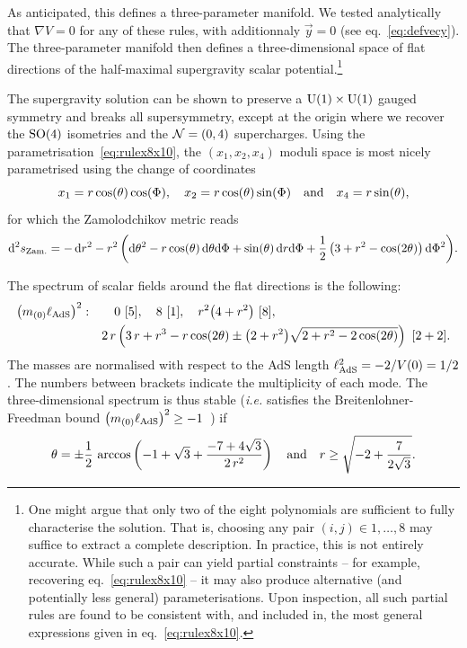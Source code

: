 \documentclass[11pt,a4paper]{article}
\renewcommand{\d}{\ensuremath{\mathrm{d}}\xspace}
\begin{document}
	As anticipated, this defines a three-parameter manifold. We tested analytically that $\nabla V = 0$ for any of these rules, with additionnaly $\vec{y}=0$ (see eq.~\eqref{eq:defvecy}). The three-parameter manifold then defines a three-dimensional space of flat directions of the half-maximal supergravity scalar potential.\footnote{One might argue that only two of the eight polynomials are sufficient to fully characterise the solution. That is, choosing any pair $(i,j) \in {1, \dots, 8}$ may suffice to extract a complete description. In practice, this is not entirely accurate. While such a pair can yield partial constraints -- for example, recovering eq.~\eqref{eq:rulex8x10} -- it may also produce alternative (and potentially less general) parameterisations. Upon inspection, all such partial rules are found to be consistent with, and included in, the most general expressions given in eq.~\eqref{eq:rulex8x10}.}

	The supergravity solution can be shown to preserve a ${\rm U}(1)\times{\rm U}(1)$ gauged symmetry and breaks all supersymmetry, except at the origin where we recover the ${\rm SO}(4)$ isometries and the ${\cal N}=(0,4)$ supercharges. Using the parametrisation~\eqref{eq:rulex8x10}, the $(x_{1},x_{2},x_{4})$ moduli space is most nicely parametrised using the change of coordinates
	\begin{equation}
		x_{1} = r\cos(\theta)\cos(\Phi), \quad x_{2} = r\cos(\theta)\sin(\Phi) \quad {\rm and} \quad x_{4} = r\sin(\theta),
	\end{equation}
	for which the Zamolodchikov metric reads
	\begin{equation}
		\d^{2}s_{\rm Zam.} = -\,\d r^{2} - r^{2}\,\bigg(\d \theta^{2} - r\cos(\theta)\,\d \theta\d\Phi + \sin(\theta)\,\d r\d\Phi + \frac{1}{2}\,\big(3+r^{2}-\cos(2\theta)\big)\,\d\Phi^{2} \bigg).
	\end{equation}

	The spectrum of scalar fields around the flat directions is the following:
	\begin{equation}
		\begin{aligned}
			\big(m_{(0)}\ell_{\rm AdS}\big)^{2}: & \qquad 0 \ [5], \quad 8 \ [1], \quad r^{2}\big(4+r^{2}\big)\ [8],\\
			& \quad 2\,r\left(3\,r + r^{3} - r\cos(2\theta) \pm \big(2+r^{2}\big) \sqrt{2+r^{2}-2\cos(2\theta)} \right)\ [2+2].
		\end{aligned}
	\end{equation}
	The masses are normalised with respect to the AdS length $\ell_{\rm AdS}^{2} = -2/V(0) = 1/2$. The numbers between brackets indicate the multiplicity of each mode. The three-dimensional spectrum is thus stable (\textit{i.e.} satisfies the Breitenlohner-Freedman bound $\big(m_{(0)}\ell_{\rm AdS}\big)^{2}\geq -1$~\cite{Breitenlohner:1982jf}) if
	\begin{equation}
		\theta = \pm\frac{1}{2}\,\arccos\left(-1 + \sqrt{3} + \frac{- 7 + 4\sqrt{3}}{2\,r^2}\right) \quad {\rm and} \quad r \geq \sqrt{-2+\frac{7}{2\sqrt{3}}}.
	\end{equation}
\end{document}

